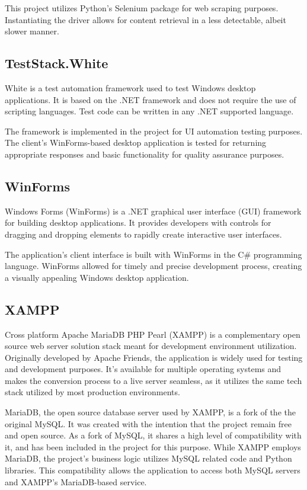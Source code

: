 \documentclass{thesis-ekf}
\theoremstyle{definition}
\theoremstyle{remark}
\begin{document}
This project utilizes Python's Selenium package for web scraping purposes. Instantiating the driver allows for content retrieval in a less detectable, albeit slower manner.

\subsection{TestStack.White}
White is a test automation framework used to test Windows desktop applications. It is based on the .NET framework and does not require the use of scripting languages. Test code can be written in any .NET supported language. \cite{docs-white}

The framework is implemented in the project for UI automation testing purposes. The client's WinForms-based desktop application is tested for returning appropriate responses and basic functionality for quality assurance purposes.

\subsection{WinForms} \label{winform}
Windows Forms (WinForms) is a .NET graphical user interface (GUI) framework for building desktop applications. It provides developers with controls for dragging and dropping elements to rapidly create interactive user interfaces. \cite{winforms}

The application's client interface is built with WinForms in the C\# programming language. WinForms allowed for timely and precise development process, creating a visually appealing Windows desktop application.

\subsection{XAMPP}
Cross platform Apache MariaDB PHP Pearl (XAMPP) is a complementary open source web server solution stack meant for development environment utilization. Originally developed by Apache Friends, the application is widely used for testing and development purposes. It's available for multiple operating systems and makes the conversion process to a live server seamless, as it utilizes the same tech stack utilized by most production environments. \cite{wiki-xampp}

MariaDB, the open source database server used by XAMPP, is a fork of the the original MySQL. It was created with the intention that the project remain free and open source. \cite{mariaDB} As a fork of MySQL, it shares a high level of compatibility with it, and has been included in the project for this purpose. While XAMPP employs MariaDB, the project's business logic utilizes MySQL related code and Python libraries. This compatibility allows the application to access both MySQL servers and XAMPP's MariaDB-based service.
\end{document}

